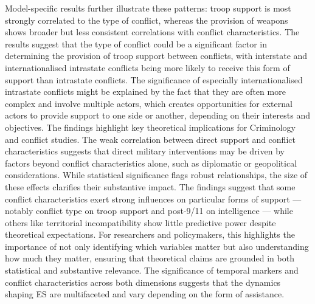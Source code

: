 \documentclass[
]{article}
\begin{document}
Model-specific results further illustrate these patterns: troop support
is most strongly correlated to the type of conflict, whereas the
provision of weapons shows broader but less consistent correlations with
conflict characteristics. The results suggest that the type of conflict
could be a significant factor in determining the provision of troop
support between conflicts, with interstate and internationalised
intrastate conflicts being more likely to receive this form of support
than intrastate conflicts. The significance of especially
internationalised intrastate conflicts might be explained by the fact
that they are often more complex and involve multiple actors, which
creates opportunities for external actors to provide support to one side
or another, depending on their interests and objectives. The findings
highlight key theoretical implications for Criminology and conflict
studies. The weak correlation between direct support and conflict
characteristics suggests that direct military interventions may be
driven by factors beyond conflict characteristics alone, such as
diplomatic or geopolitical considerations. While statistical
significance flags robust relationships, the size of these effects
clarifies their substantive impact. The findings suggest that some
conflict characteristics exert strong influences on particular forms of
support --- notably conflict type on troop support and post-9/11 on
intelligence --- while others like territorial incompatibility show
little predictive power despite theoretical expectations. For
researchers and policymakers, this highlights the importance of not only
identifying which variables matter but also understanding how much they
matter, ensuring that theoretical claims are grounded in both
statistical and substantive relevance. The significance of temporal
markers and conflict characteristics across both dimensions suggests
that the dynamics shaping ES are multifaceted and vary depending on the
form of assistance.
\end{document}
